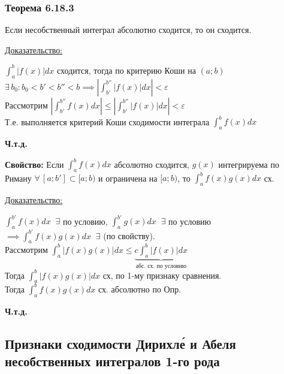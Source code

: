 \documentclass[12pt]{article}
\begin{document}
    \subsubsection*{Теорема 6.18.3}\label{th:6.18.3}
    Если несобственный интеграл абсолютно сходится, то он сходится.\par\noindent
    \underline{Доказательство:}
    \begin{adjustwidth}{1.5em}{1.5em}
        $\int_{a}^{b}|f(x)|dx$ сходится, тогда по критерию Коши на $(a;b)$ $\exists\,b_0:b_0<b'<b''<b \implies \left|\int_{b'}^{b''}|f(x)|dx\right|< \varepsilon$\\
        Рассмотрим $\left|\int_{b'}^{b''}f(x)dx\right|\leq \left|\int_{b'}^{b''}|f(x)|dx\right|<\varepsilon$\\
        Т.е. выполняется критерий Коши сходимости интеграла $\int_{a}^{b}f(x)dx$
        \begin{center}
            \textbf{Ч.т.д.}
        \end{center}
    \end{adjustwidth}
    \textbf{Свойство:} Если $\int_{a}^{b}f(x)dx$ абсолютно сходится, $g(x)$ интегрируема по Риману $\forall\,[a;b'] \subset [a;b)$ и ограничена на $[a;b)$, то $\int_{a}^{b}f(x)g(x)dx$ сх.\par\noindent
    \underline{Доказательство:}
    \begin{adjustwidth}{1.5em}{1.5em}
        $\int_{a}^{b'}f(x)dx \;\; \exists$ по условию, $\int_{a}^{b'}g(x)dx \;\; \exists$ по условию $\implies \int_{a}^{b'}f(x)g(x)dx \;\; \exists$ (по свойству).\\
        Рассмотрим $\int_{a}^{b}|f(x)g(x)|dx \leq \underbrace{c\int_{a}^{b}|f(x)|dx}_{\text{абс. сх. по условию}}$\\
        Тогда $\int_{a}^{b}|f(x)g(x)|dx$ сх, по 1-му признаку сравнения.\\
        Тогда $\int_{a}^{b}f(x)g(x)dx$ сх. абсолютно по Опр.
    \end{adjustwidth}
    \begin{center}
        \textbf{Ч.т.д.}
    \end{center}

    \subsection{Признаки сходимости Дирихле́ и Абеля несобственных интегралов 1-го рода}
\end{document}
